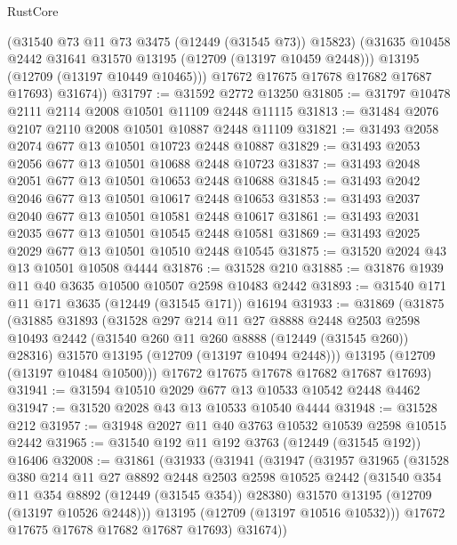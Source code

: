 \begin{lexlean}{RustCore}
\begin{coremodule}
            (@31540 @73 @11 @73 @3475 (@12449 (@31545 @73)) @15823)
            (@31635 @10458 @2442 @31641 @31570 @13195 (@12709 (@13197 @10459 @2448)))
            @13195
            (@12709 (@13197 @10449 @10465)))
          @17672
          @17675
          @17678
          @17682
          @17687
          @17693)
        @31674))
@31797 := @31592 @2772 @13250
@31805 := @31797 @10478 @2111 @2114 @2008 @10501 @11109 @2448 @11115
@31813 := @31484 @2076 @2107 @2110 @2008 @10501 @10887 @2448 @11109
@31821 := @31493 @2058 @2074 @677 @13 @10501 @10723 @2448 @10887
@31829 := @31493 @2053 @2056 @677 @13 @10501 @10688 @2448 @10723
@31837 := @31493 @2048 @2051 @677 @13 @10501 @10653 @2448 @10688
@31845 := @31493 @2042 @2046 @677 @13 @10501 @10617 @2448 @10653
@31853 := @31493 @2037 @2040 @677 @13 @10501 @10581 @2448 @10617
@31861 := @31493 @2031 @2035 @677 @13 @10501 @10545 @2448 @10581
@31869 := @31493 @2025 @2029 @677 @13 @10501 @10510 @2448 @10545
@31875 := @31520 @2024 @43 @13 @10501 @10508 @4444
@31876 := @31528 @210
@31885 := @31876 @1939 @11 @40 @3635 @10500 @10507 @2598 @10483 @2442
@31893 := @31540 @171 @11 @171 @3635 (@12449 (@31545 @171)) @16194
@31933 := @31869
    (@31875
      (@31885
        @31893
        (@31528
          @297
          @214
          @11
          @27
          @8888
          @2448
          @2503
          @2598
          @10493
          @2442
          (@31540 @260 @11 @260 @8888 (@12449 (@31545 @260)) @28316)
          @31570
          @13195
          (@12709 (@13197 @10494 @2448)))
        @13195
        (@12709 (@13197 @10484 @10500)))
      @17672
      @17675
      @17678
      @17682
      @17687
      @17693)
@31941 := @31594 @10510 @2029 @677 @13 @10533 @10542 @2448 @4462
@31947 := @31520 @2028 @43 @13 @10533 @10540 @4444
@31948 := @31528 @212
@31957 := @31948 @2027 @11 @40 @3763 @10532 @10539 @2598 @10515 @2442
@31965 := @31540 @192 @11 @192 @3763 (@12449 (@31545 @192)) @16406
@32008 := @31861
    (@31933
      (@31941
        (@31947
          (@31957
            @31965
            (@31528
              @380
              @214
              @11
              @27
              @8892
              @2448
              @2503
              @2598
              @10525
              @2442
              (@31540 @354 @11 @354 @8892 (@12449 (@31545 @354)) @28380)
              @31570
              @13195
              (@12709 (@13197 @10526 @2448)))
            @13195
            (@12709 (@13197 @10516 @10532)))
          @17672
          @17675
          @17678
          @17682
          @17687
          @17693)
        @31674))

\end{coremodule}
\end{lexlean}
